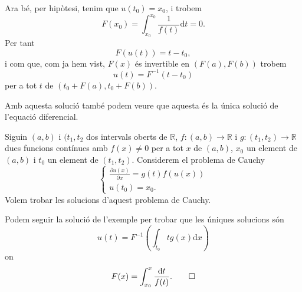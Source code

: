 \documentclass[../Apunts.tex]{subfiles}
\begin{document}
\begin{example}
\begin{solution}
			Ara bé, per hipòtesi, tenim que \(u(t_{0})=x_{0}\), i trobem
			\[F(x_{0})=\int_{x_{0}}^{x_{0}}\frac{1}{f(t)}\text{d}t=0.\]
			Per tant
			\[F(u(t))=t-t_{0},\]
			i com que, com ja hem vist, \(F(x)\) és invertible en \((F(a),F(b))\) trobem
			\[u(t)=F^{-1}(t-t_{0})\]
			per a tot \(t\) de \((t_{0}+F(a), t_{0}+F(b))\).
			
			Amb aquesta solució també podem veure que aquesta és la única solució de l'equació diferencial.
		\end{solution}
	\end{example}
	\begin{example}
		\label{ex:Equacions de variables separades}
		Siguin \((a,b)\) i \((t_{1},t_{2}\) dos intervals oberts de \(\mathbb{R}\), \(f\colon(a,b)\longrightarrow\mathbb{R}\) i \(g\colon(t_{1},t_{2})\longrightarrow\mathbb{R}\) dues funcions contínues amb \(f(x)\neq0\) per a tot \(x\) de \((a,b)\), \(x_{0}\) un element de \((a,b)\) i \(t_{0}\) un element de \((t_{1},t_{2})\). Considerem el problema de Cauchy
		\begin{equation}
			\begin{cases}
				\displaystyle \frac{\partial u(x)}{\partial x}=g(t)f(u(x)) \\
				\displaystyle u(t_{0})=x_{0}.
			\end{cases}
		\end{equation}
		Volem trobar les solucions d'aquest problema de Cauchy.
		\begin{solution}
			Podem seguir la solució de l'exemple  per trobar que les úniques solucions són
			\[u(t)=F^{-1}\left(\int_{t_{0}}{t}g(x)\text{d}x\right)\]
			on
			\[F(x)=\int_{x_{0}}^{x}\frac{\text{d}t}{f(t)}.\qedhere\]
		\end{solution}
	\end{example}
\end{document}
